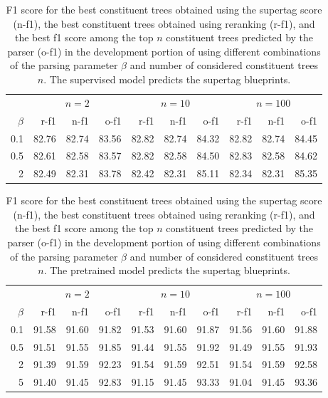 \documentclass[../../document.tex]{subfiles}
\begin{document}
    \begin{table}
        \caption{\label{tbl:grid:reranking:supervised}
        F1 score for the best constituent trees obtained using the supertag score (n-f1), the best constituent trees obtained using reranking (r-f1), and the best f1 score among the top $n$ constituent trees predicted by the parser (o-f1) in the development portion of \negra{} using different combinations of the parsing parameter $\beta$ and number of considered constituent trees $n$. The supervised model predicts the supertag blueprints.
        }
        \centering
        \vspace{.2cm}
        \begin{tabular}{r|rrr|rrr|rrr}
            \toprule
       & \multicolumn{3}{c|}{$n = 2$} & \multicolumn{3}{c|}{$n = 10$}& \multicolumn{3}{c}{$n = 100$}\\
 \(\beta\) & r-f1 & n-f1 & o-f1  & r-f1 & n-f1 & o-f1 & r-f1 & n-f1 & o-f1   \\
\hline
0.1 & 82.76 & 82.74 & 83.56 & 82.82 & 82.74 & 84.32 & 82.82 & 82.74 & 84.45 \\
0.5 & 82.61 & 82.58 & 83.57 & 82.82 & 82.58 & 84.50 & 82.83 & 82.58 & 84.62 \\
  2 & 82.49 & 82.31 & 83.78 & 82.42 & 82.31 & 85.11 & 82.34 & 82.31 & 85.35 \\
\bottomrule
        \end{tabular}
    \end{table}

    \begin{table}
        \caption{\label{tbl:grid:reranking:pretrained}
        F1 score for the best constituent trees obtained using the supertag score (n-f1), the best constituent trees obtained using reranking (r-f1), and the best f1 score among the top $n$ constituent trees predicted by the parser (o-f1) in the development portion of \negra{} using different combinations of the parsing parameter $\beta$ and number of considered constituent trees $n$. The pretrained model predicts the supertag blueprints.
        }
        \centering
        \vspace{.2cm}
        \begin{tabular}{r|rrr|rrr|rrr}
            \toprule
       & \multicolumn{3}{c|}{$n = 2$} & \multicolumn{3}{c|}{$n = 10$}& \multicolumn{3}{c}{$n = 100$}\\
 \(\beta\) & r-f1 & n-f1 & o-f1  & r-f1 & n-f1 & o-f1 & r-f1 & n-f1 & o-f1   \\
\hline
0.1 & 91.58 & 91.60 & 91.82 & 91.53 & 91.60 & 91.87 & 91.56 & 91.60 & 91.88\\
0.5 & 91.51 & 91.55 & 91.85 & 91.44 & 91.55 & 91.92 & 91.49 & 91.55 & 91.93 \\
  2 & 91.39 & 91.59 & 92.23 & 91.54 & 91.59 & 92.51 & 91.54 & 91.59 & 92.58 \\
  5 & 91.40 & 91.45 & 92.83 & 91.15 & 91.45 & 93.33 & 91.04 & 91.45 & 93.36 \\
\bottomrule
        \end{tabular}
    \end{table}
\end{document}
